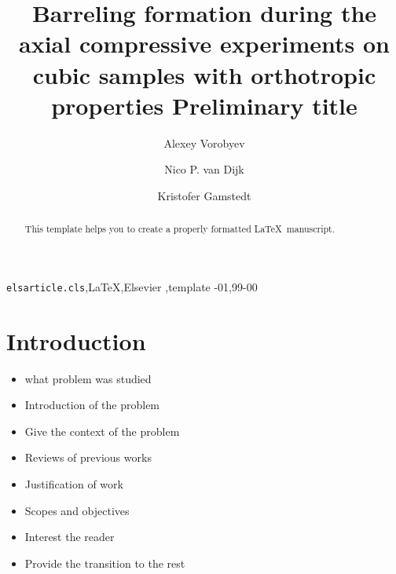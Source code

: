 \documentclass[review]{elsarticle}
\begin{document}
\begin{frontmatter}

\title{Barreling formation during the axial compressive experiments on cubic
samples with orthotropic properties {\color{red} Preliminary title}}








\author{Alexey Vorobyev}


\author{Nico P. van Dijk}
\author{Kristofer Gamstedt}

\address{Uppsala University, Division of Appplied Mechanics,
Uppsala, Sweden }



\begin{abstract}
This template helps you to create a properly formatted \LaTeX\ manuscript.
\end{abstract}

\begin{keyword}
\texttt{elsarticle.cls}\sep \LaTeX\sep Elsevier \sep template
-01\sep  99-00
\end{keyword}

\end{frontmatter}

\linenumbers

\section{Introduction}
\begin{itemize}
\color{red}  
\item what problem was studied
\item Introduction of the problem
\item Give the context of the problem
\item Reviews of previous works
\item Justification of work
\item Scopes and objectives
\item Interest the reader
\item Provide the transition to the rest
\end{itemize}
\end{document}
